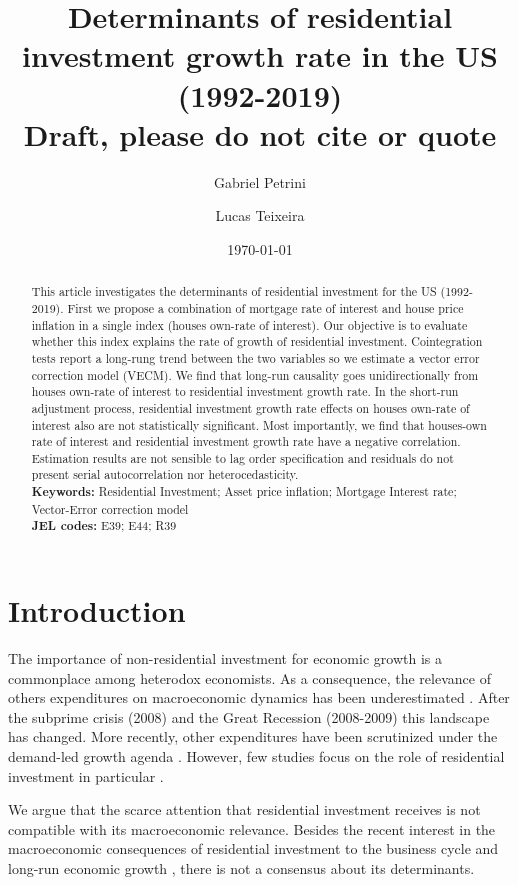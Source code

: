 \documentclass[12pt, a4paper]{article}
\author[1]{Gabriel Petrini}
\affil[1]{PhD Student at University of Campinas (Brazil), Email: \url{gpetrinidasilveira@gmail.com}} %
\author[2]{Lucas Teixeira}
\affil[2]{Assistant Professor at University of Campinas (Brazil), Email: \url{lucastei@unicamp.br}} %
\date{\today}
\title{Determinants of residential investment growth rate in the US (1992-2019)\\\medskip
\large Draft, please do not cite or quote}
\begin{document}
\maketitle



\begin{abstract}
This article investigates the determinants of residential investment for the US (1992-2019).
First we propose a combination of mortgage rate of interest and house price inflation in a single index (houses own-rate of interest).
Our objective is to evaluate whether this index explains the rate of growth of residential investment.
Cointegration tests report a long-rung trend between the two variables so we estimate a vector error correction model (VECM).
We find that long-run causality goes unidirectionally from houses own-rate of interest to residential investment growth rate.
In the short-run adjustment process, residential investment growth rate effects on houses own-rate of interest also are not statistically significant.
Most importantly, we find that houses-own rate of interest and residential investment growth rate have a negative correlation.
Estimation results are not sensible to lag order specification and residuals do not present serial autocorrelation nor heterocedasticity.
\\
\noindent \textbf{Keywords:} Residential Investment; Asset price inflation; Mortgage Interest rate; Vector-Error correction model\\
\noindent \textbf{JEL codes:} E39; E44; R39
\end{abstract}


\section{Introduction}
\label{sec:orgb89e324}
\label{sec:Introduction}
The importance of non-residential investment for economic growth is a commonplace among heterodox economists.
As a consequence, the relevance of others expenditures on macroeconomic dynamics has been underestimated \cite{brochier_macroeconomics_2017}.
After the subprime crisis (2008) and the Great Recession (2008-2009) this landscape has changed.
More recently, other expenditures have been scrutinized under the demand-led growth agenda \cites{freitas_pattern_2013}{girardi_long-run_2016}{girardi_autonomous_2018}{braga_investment_2018}.
However, few studies focus on the role of residential investment in particular \cite{petrini_2021_TD}.

We argue that the scarce attention that residential investment receives is not compatible with its macroeconomic relevance.
Besides the recent interest in the macroeconomic consequences of residential investment to the business cycle and long-run economic growth \cite{fiebiger_trend_2017,fiebiger_semi-autonomous_2018,perez_Montiel_2021}, there is not a consensus about its determinants.
\end{document}
